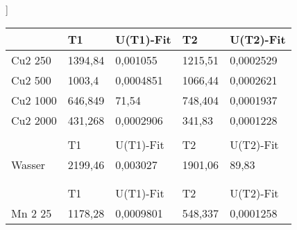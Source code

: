  \begin{table}[H]
    \centering]
    \begin{tabular}{lllll}
    \hline
    \multicolumn{1}{|l|}{}            & \multicolumn{1}{l|}{T1}      & \multicolumn{1}{l|}{U(T1)-Fit} & \multicolumn{1}{l|}{T2}      & \multicolumn{1}{l|}{U(T2)-Fit}  \\ \hline
    \multicolumn{1}{|l|}{Cu2    250}  & \multicolumn{1}{l|}{1394,84} & \multicolumn{1}{l|}{0,001055}  & \multicolumn{1}{l|}{1215,51} & \multicolumn{1}{l|}{0,0002529}  \\ \hline
    \multicolumn{1}{|l|}{Cu2    500}  & \multicolumn{1}{l|}{1003,4}  & \multicolumn{1}{l|}{0,0004851} & \multicolumn{1}{l|}{1066,44} & \multicolumn{1}{l|}{0,0002621}  \\ \hline
    \multicolumn{1}{|l|}{Cu2    1000} & \multicolumn{1}{l|}{646,849} & \multicolumn{1}{l|}{71,54}     & \multicolumn{1}{l|}{748,404} & \multicolumn{1}{l|}{0,0001937}  \\ \hline
    \multicolumn{1}{|l|}{Cu2    2000} & \multicolumn{1}{l|}{431,268} & \multicolumn{1}{l|}{0,0002906} & \multicolumn{1}{l|}{341,83}  & \multicolumn{1}{l|}{0,0001228}  \\ \hline
                                      &                              &                                &                              &                                 \\ \hline
    \multicolumn{1}{|l|}{}            & \multicolumn{1}{l|}{T1}      & \multicolumn{1}{l|}{U(T1)-Fit} & \multicolumn{1}{l|}{T2}      & \multicolumn{1}{l|}{U(T2)-Fit}  \\ \hline
    \multicolumn{1}{|l|}{Wasser}      & \multicolumn{1}{l|}{2199,46} & \multicolumn{1}{l|}{0,003027}  & \multicolumn{1}{l|}{1901,06} & \multicolumn{1}{l|}{89,83}      \\ \hline
                                      &                              &                                &                              &                                 \\
                                      &                              &                                &                              &                                 \\ \hline
    \multicolumn{1}{|l|}{}            & \multicolumn{1}{l|}{T1}      & \multicolumn{1}{l|}{U(T1)-Fit} & \multicolumn{1}{l|}{T2}      & \multicolumn{1}{l|}{U(T2)-Fit}  \\ \hline
    \multicolumn{1}{|l|}{Mn 2 25}     & \multicolumn{1}{l|}{1178,28} & \multicolumn{1}{l|}{0,0009801} & \multicolumn{1}{l|}{548,337} & \multicolumn{1}{l|}{0,0001258}  \\ \hline

\end{tabular}
\end{table}
